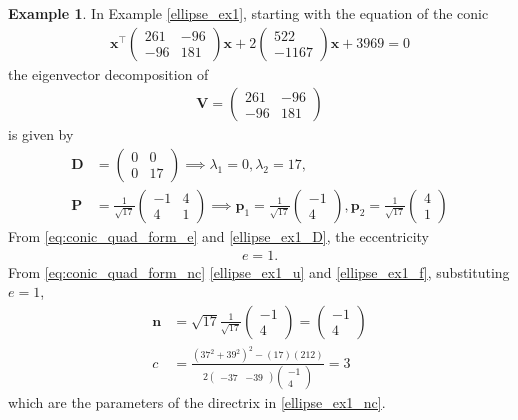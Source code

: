\documentclass[]{interact}
\theoremstyle{plain}%
\theoremstyle{definition}
\newtheorem{example}[theorem]{Example}
\theoremstyle{remark}
\providecommand{\brak}[1]{\ensuremath{\left(#1\right)}}
\newcommand{\myvec}[1]{\ensuremath{\begin{pmatrix}#1\end{pmatrix}}}
\let\vec\mathbf
\begin{document}
\begin{example}
  In Example \ref{ellipse_ex1}, starting with the equation of the conic
  \begin{align}
    \label{ellipse_ex1_conic}
    \vec{x}^{\top}\myvec{261 & -96\\-96 & 181}\vec{x} + 
     2 \myvec{ 522\\-1167}\vec{x}+ 3969 = 0
    \end{align}
    the eigenvector decomposition of 
    \begin{align}
      \vec{V} = \myvec{261 & -96\\-96 & 181}
      \end{align}
      is given by 
      \begin{align}
      \label{ellipse_ex1_D}
        \vec{D} &= \myvec{0 &  0 \\  0 & 17} \implies \lambda_1 = 0, \lambda_2 = 17,
        \\
        \label{ellipse_ex1_P}
        \vec{P} &= \frac{1}{\sqrt{17}}\myvec{-1 &  4 \\  4 & 1} \implies \vec{p}_1 = \frac{1}{\sqrt{17}}\myvec{-1  \\  4 }, \vec{p}_2 = \frac{1}{\sqrt{17}}\myvec{4  \\  1 }
        \end{align}
  From \eqref{eq:conic_quad_form_e} and     \eqref{ellipse_ex1_D}, the eccentricity
  \begin{align}
  e = 1.
      \end{align}
      From \eqref{eq:conic_quad_form_nc} \eqref{ellipse_ex1_u} and \eqref{ellipse_ex1_f}, substituting $e = 1$,  
        \begin{align}
          \vec{n}&= \sqrt{17}\frac{1}{\sqrt{17}}\myvec{-1 \\  4 } = \myvec{-1 \\  4 }
          \\
          c &= \frac{\brak{37^2+39^2}^2 - (17) (212)   }{2\myvec{-37&-39}\myvec{-1 \\  4 }} = 3
       \end{align}  
       which are the parameters of the directrix in \eqref{ellipse_ex1_nc}.
  \end{example}
  
\end{document}
